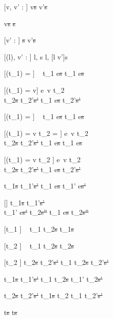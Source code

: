 [v, v' : \tau]
  { }
  {\Edit v\st{s}  \Edit v'\st{s}}

  { }
  {\Edit v\st{s} \handle{\Clear} \Empty\st{s}}

[v' : \tau]
  { }
  {\Empty \tau\st{s}  \Edit v'\st{s}}

[\Sigma(l), v' : \tau]
  { }
  {\Watch l, s  \Watch l, [l \mapsto v']s}

[\Value(t_1) = \nothing]
  {\ }
  {t_1 \Then e\st{s} \handle{\Next} t_1 \Then e\st{s}}

[\Value(t_1) = v]
  {e\ v \downto t_2    \\
   t_2\st{s} \normalise t_2'\st{s'} }
  {t_1 \Then e\st{s} \handle{\Next} t_2'\st{s'}}

[\Value(t_1) = \nothing]
  {\ }
  {t_1 \When e\st{s} \handle{\Execute \pi} t_1 \When e\st{s}}

[\Value(t_1) = v \land t_2 = \Fail]
  {e\ v \downto t_2    \\
   t_2\st{s} \handle{\Pick \pi} t_2'\st{s'} }
  {t_1 \When e\st{s} \handle{\Execute \pi} t_1 \When e\st{s}}

[\Value(t_1) = v \land t_2 \neq \Fail]
  {e\ v \downto t_2    \\
   t_2\st{s} \handle{\Pick \pi} t_2'\st{s'} }
  {t_1 \When e\st{s} \handle{\Execute \pi} t_2'\st{s'}}

  {t_1\st{s} \handle{\eta} t_1'\st{s'}}
  {t_1 \Then e\st{s} \handle{\eta} t_1' \Then e\st{s'}}

[\eta \neq \Execute \pi]
  {t_1\st{s} \handle{\eta} t_1'\st{s'}       \\
   t_1' \When e\st{s'} \normalise t_2\st{s''} }
  {t_1 \When e\st{s} \handle{\eta} t_2\st{s''}}

[t_1 \neq \Fail]
  {\ }
  {t_1 \Or t_2\st{s} \handle{\Pick \First} t_1\st{s}}

[t_2 \neq \Fail]
  {\ }
  {t_1 \Or t_2\st{s} \handle{\Pick \Second} t_2\st{s}}

[t_2 \neq \Fail]
  {t_2\st{s} \handle{\Pick \pi} t_2'\st{s'}}
  {t_1 \Or t_2\st{s} \handle{\Pick \Other \pi} t_2'\st{s'}}


  {t_1\st{s} \handle{\eta} t_1'\st{s'} }
  {t_1 \AndOr t_2\st{s} \handle{\Left \eta} t_1' \AndOr t_2\st{s'}}

  {t_2\st{s} \handle{\eta} t_2'\st{s'} }
  {t_1\st{s} \AndOr t_2 \handle{\Right \eta} t_1 \AndOr t_2'\st{s'}}

  { }
  {t\st{s} \handle{\eta} t\st{s}}
